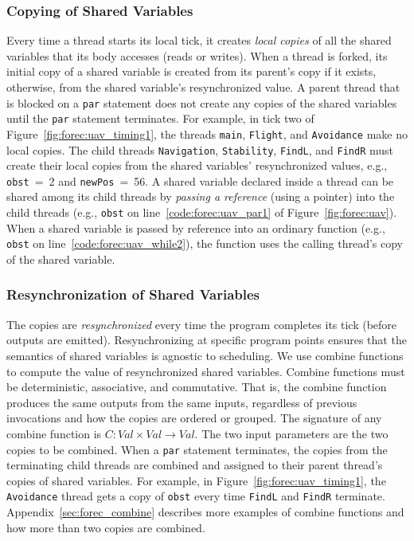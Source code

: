 \subsubsection{Copying of Shared Variables}
\label{sec:forec:shared_variables_copying}
Every time a thread starts its local tick, it creates
\emph{local copies} of all the shared variables that its body
accesses (reads or writes). 
When a thread is forked, its initial copy of a shared variable 
is created from its parent's copy if it exists, otherwise, from 
the shared variable's resynchronized value.
A parent thread that is blocked on a \verb$par$ statement
does not create any copies of the shared variables until 
the \verb$par$ statement terminates. For example, in tick 
two of Figure~\ref{fig:forec:uav_timing1}, the threads 
\texttt{main}, \texttt{Flight}, and \texttt{Avoidance} 
make no local copies. The child threads \texttt{Navigation}, 
\texttt{Stability}, \texttt{FindL}, and \texttt{FindR} must
create their local copies from the shared variables' resynchronized
values, e.g., \texttt{obst}~=~2 and \texttt{newPos}~=~56. 
A shared variable declared inside a thread can be shared
among its child threads by \emph{passing a reference} (using a
pointer) into the child threads
(e.g., \verb$obst$ on line~\ref{code:forec:uav_par1} of
Figure~\ref{fig:forec:uav}). When a shared variable is
passed by reference into an ordinary function (e.g.,
\verb$obst$ on line~\ref{code:forec:uav_while2}), the 
function uses the calling thread's copy of the shared variable. 

\subsubsection{Resynchronization of Shared Variables}
\label{sec:forec:shared_variables_resync}
The copies are \emph{resynchronized} every time the program
completes its tick (before outputs are emitted).
Resynchronizing at specific program points ensures that the
semantics of shared variables is agnostic to scheduling. 
We use combine functions to compute the value of resynchronized
shared variables. Combine functions must be
deterministic, associative, and commutative. That
is, the combine function produces the same outputs from the
same inputs, regardless of previous invocations and how the
copies are ordered or grouped. The signature of any combine
function is 
$\mathit{C}: \mathit{Val} \times \mathit{Val} \to \mathit{Val}$. 
The two input parameters are the two
copies to be combined. 
When a \verb$par$ statement terminates, the copies
from the terminating child threads are combined and
assigned to their parent thread's copies of shared variables.
For example, in Figure~\ref{fig:forec:uav_timing1}, the \verb$Avoidance$
thread gets a copy of \verb$obst$ every time \verb$FindL$ and 
\verb$FindR$ terminate. Appendix~\ref{sec:forec_combine} 
describes more examples of combine functions and how more than 
two copies are combined. 

